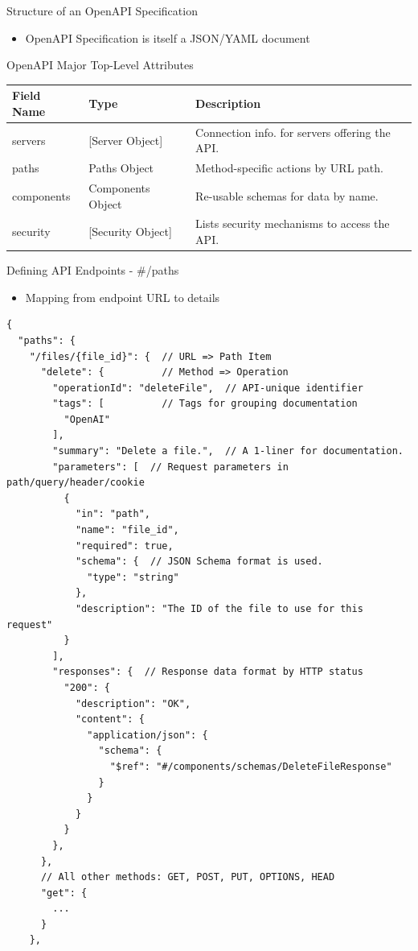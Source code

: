 \documentclass[bigger]{beamer}
\begin{document}
\begin{frame}[label={sec:org5268acc}]{Structure of an OpenAPI Specification}
\begin{itemize}
\item OpenAPI Specification is itself a JSON/YAML document
\end{itemize}

\begin{block}{OpenAPI Major Top-Level Attributes}
\scriptsize
\begin{center}
\begin{tabular}{lll}
\alert{Field Name} & \alert{Type} & \alert{Description}\\[0pt]
\hline
servers & [Server Object] & Connection info. for servers offering the API.\\[0pt]
paths & Paths Object & Method-specific actions by URL path.\\[0pt]
components & Components Object & Re-usable schemas for data by name.\\[0pt]
security & [Security Object] & Lists security mechanisms to access the API.\\[0pt]
\end{tabular}
\end{center}
\end{block}
\end{frame}

\begin{frame}[label={sec:orgf6cf7f3},fragile]{Defining API Endpoints - \#/paths}
 \begin{itemize}
\item Mapping from endpoint URL to details
\end{itemize}

\scriptsize
\begin{verbatim}
{
  "paths": {
    "/files/{file_id}": {  // URL => Path Item
      "delete": {          // Method => Operation
        "operationId": "deleteFile",  // API-unique identifier
        "tags": [          // Tags for grouping documentation
          "OpenAI"
        ],
        "summary": "Delete a file.",  // A 1-liner for documentation.
        "parameters": [  // Request parameters in path/query/header/cookie
          {
            "in": "path",
            "name": "file_id",
            "required": true,
            "schema": {  // JSON Schema format is used.
              "type": "string"
            },
            "description": "The ID of the file to use for this request"
          }
        ],
        "responses": {  // Response data format by HTTP status
          "200": {
            "description": "OK",
            "content": {
              "application/json": {
                "schema": {
                  "$ref": "#/components/schemas/DeleteFileResponse"
                }
              }
            }
          }
        },
      },
      // All other methods: GET, POST, PUT, OPTIONS, HEAD
      "get": {
        ...
      }
    },
\end{verbatim}
\end{frame}
\end{document}
